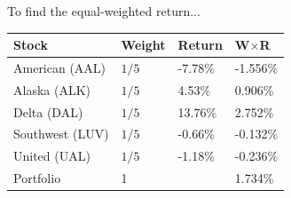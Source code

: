 To find the equal-weighted return...
\begin{center}
	{\color{blue}
	\begin{tabular}{l|lll}
		\textbf{Stock} & \textbf{W}eight & \textbf{R}eturn & \textbf{W}$\times$\textbf{R}\\ \hline
		American (AAL) & $1/5$ & -7.78\% & -1.556\% \\
		Alaska (ALK) & $1/5$ & 4.53\% & 0.906\% \\
		Delta (DAL) & $1/5$ & 13.76\% & 2.752\% \\
		Southwest (LUV) & $1/5$ & -0.66\% & -0.132\% \\
		United (UAL) & $1/5$ & -1.18\% & -0.236\% \\ \hline 
		Portfolio & 1 && 1.734\% \\\hline
	\end{tabular}
	}
\end{center}